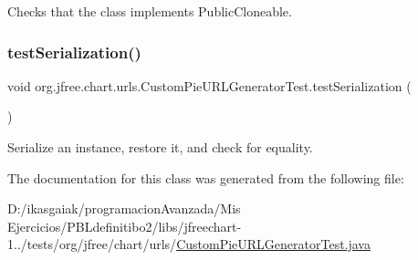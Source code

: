 Checks that the class implements Public\+Cloneable. \mbox{\label{classorg_1_1jfree_1_1chart_1_1urls_1_1_custom_pie_u_r_l_generator_test_a225d765c3dcedbb868a41df11513a867}} 
\subsubsection{\texorpdfstring{test\+Serialization()}{testSerialization()}}
{\footnotesize\ttfamily void org.\+jfree.\+chart.\+urls.\+Custom\+Pie\+U\+R\+L\+Generator\+Test.\+test\+Serialization (\begin{DoxyParamCaption}{ }\end{DoxyParamCaption})}

Serialize an instance, restore it, and check for equality. 

The documentation for this class was generated from the following file\+:\begin{DoxyCompactItemize}
\item 
D\+:/ikasgaiak/programacion\+Avanzada/\+Mis Ejercicios/\+P\+B\+Ldefinitibo2/libs/jfreechart-\/1../tests/org/jfree/chart/urls/\mbox{\hyperlink{_custom_pie_u_r_l_generator_test_8java}{Custom\+Pie\+U\+R\+L\+Generator\+Test.\+java}}\end{DoxyCompactItemize}
